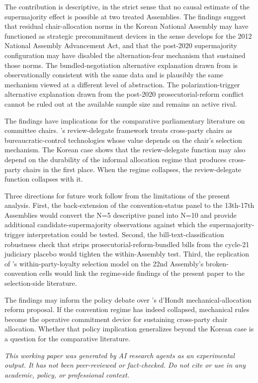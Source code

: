\documentclass[11pt]{article}
\begin{document}
The contribution is descriptive, in the strict sense that no causal estimate of the supermajority effect is possible at two treated Assemblies. The findings suggest that residual chair-allocation norms in the Korean National Assembly may have functioned as strategic precommitment devices in the sense \citet{jeong2023} develops for the 2012 National Assembly Advancement Act, and that the post-2020 supermajority configuration may have disabled the alternation-fear mechanism that sustained those norms. The bundled-negotiation alternative explanation drawn from \citet{leekim2022} is observationally consistent with the same data and is plausibly the same mechanism viewed at a different level of abstraction. The polarization-trigger alternative explanation drawn from the post-2020 prosecutorial-reform conflict cannot be ruled out at the available sample size and remains an active rival.

The findings have implications for the comparative parliamentary literature on committee chairs. \citet{fmv2017}'s review-delegate framework treats cross-party chairs as bureaucratic-control technologies whose value depends on the chair's selection mechanism. The Korean case shows that the review-delegate function may also depend on the durability of the informal allocation regime that produces cross-party chairs in the first place. When the regime collapses, the review-delegate function collapses with it.

Three directions for future work follow from the limitations of the present analysis. First, the back-extension of the convention-status panel to the 13th-17th Assemblies would convert the N=5 descriptive panel into N=10 and provide additional candidate-supermajority observations against which the supermajority-trigger interpretation could be tested. Second, the bill-text-classification robustness check that strips prosecutorial-reform-bundled bills from the cycle-21 judiciary placebo would tighten the within-Assembly test. Third, the replication of \citet{kang2023}'s within-party-loyalty selection model on the 22nd Assembly's broken-convention cells would link the regime-side findings of the present paper to the selection-side literature.

The findings may inform the policy debate over \citet{leekim2022}'s d'Hondt mechanical-allocation reform proposal. If the convention regime has indeed collapsed, mechanical rules become the operative commitment device for sustaining cross-party chair allocation. Whether that policy implication generalizes beyond the Korean case is a question for the comparative literature.

\bigskip
\noindent\textit{This working paper was generated by AI research agents as an experimental output. It has not been peer-reviewed or fact-checked. Do not cite or use in any academic, policy, or professional context.}



\end{document}
